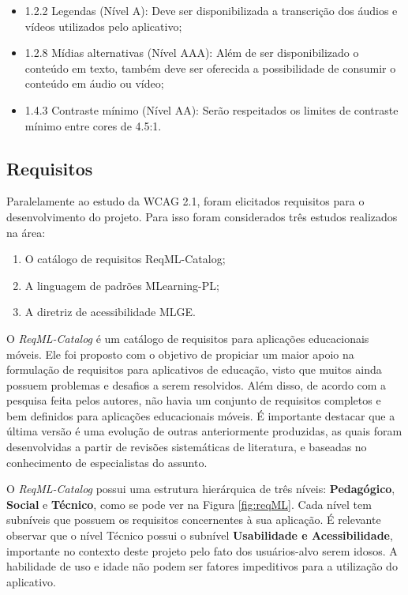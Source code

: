 \begin{itemize}
    \item 1.2.2 Legendas (Nível A): Deve ser disponibilizada a transcrição dos áudios e vídeos utilizados pelo aplicativo;
    \item 1.2.8 Mídias alternativas (Nível AAA): Além de ser disponibilizado o conteúdo em texto, também deve ser oferecida a possibilidade de consumir o conteúdo em áudio ou vídeo;
    \item 1.4.3 Contraste mínimo (Nível AA): Serão respeitados os limites de contraste mínimo entre cores de 4.5:1.
\end{itemize}


\subsection{Requisitos}
Paralelamente ao estudo da WCAG 2.1, foram elicitados requisitos para o desenvolvimento do projeto. Para isso foram considerados três estudos realizados na área: 
\begin{enumerate}
    \item O catálogo de requisitos ReqML-Catalog;
    \item A linguagem de padrões MLearning-PL;
    \item A diretriz de acessibilidade MLGE.
\end{enumerate}

O \textit{ReqML-Catalog}
\citep{soad2017reqml} é um catálogo de requisitos para aplicações educacionais móveis. Ele foi proposto com o objetivo de propiciar um maior apoio na formulação de requisitos para aplicativos de educação, visto que muitos ainda possuem problemas e desafios a serem resolvidos. Além disso, de acordo com a pesquisa feita pelos autores, não havia um conjunto de requisitos completos e bem definidos para aplicações educacionais móveis. É importante destacar que a última versão é uma evolução de outras anteriormente produzidas, as quais foram desenvolvidas a partir de revisões sistemáticas de literatura, e baseadas no conhecimento de especialistas do assunto. 

O \textit{ReqML-Catalog} possui uma estrutura hierárquica de três níveis: \textbf{Pedagógico}, \textbf{Social} e \textbf{Técnico}, como se pode ver na Figura \ref{fig:reqML}. Cada nível tem subníveis que possuem os requisitos concernentes à sua aplicação. É relevante observar que o nível Técnico possui o subnível \textbf{Usabilidade e Acessibilidade}, importante no contexto deste projeto pelo fato dos usuários-alvo serem idosos. A habilidade de uso e idade não podem ser fatores impeditivos para a utilização do aplicativo.

